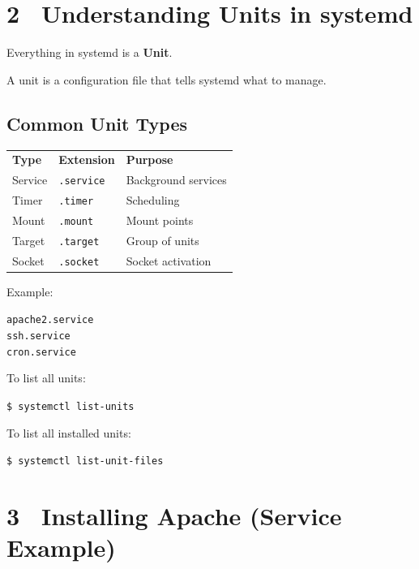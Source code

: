 \documentclass[12pt]{article}
\newcommand{\uniticon}{\faFile}
\begin{document}
\section*{2 \uniticon\ Understanding Units in systemd}

Everything in systemd is a \textbf{Unit}.

A unit is a configuration file that tells systemd what to manage.

\subsection*{Common Unit Types}

\begin{infobox}
\begin{tabular}{lll}
\textbf{Type} & \textbf{Extension} & \textbf{Purpose} \\
Service & \texttt{.service} & Background services \\
Timer & \texttt{.timer} & Scheduling \\
Mount & \texttt{.mount} & Mount points \\
Target & \texttt{.target} & Group of units \\
Socket & \texttt{.socket} & Socket activation \\
\end{tabular}
\end{infobox}

Example:

\begin{highlightbox}
\texttt{apache2.service}\\
\texttt{ssh.service}\\
\texttt{cron.service}
\end{highlightbox}

To list all units:

\begin{highlightbox}
\texttt{\$ systemctl list-units}
\end{highlightbox}

To list all installed units:

\begin{highlightbox}
\texttt{\$ systemctl list-unit-files}
\end{highlightbox}

\section*{3 \faDownload\ Installing Apache (Service Example)}
\end{document}
